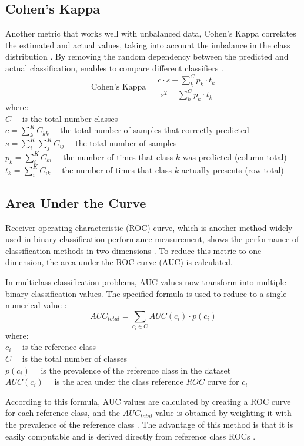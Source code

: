 \subsection{Cohen's Kappa}
Another metric that works well with unbalanced data, Cohen's Kappa correlates the estimated and actual values, taking into account the imbalance in the class distribution \cite{maaritwidmannalfredoroccato2021}. By removing the random dependency between the predicted and actual classification, enables to compare different classifiers \cite{grandini2020metrics}. 
\begin{equation}
\text{Cohen's Kappa} = \displaystyle\frac{c \cdot s-\displaystyle\sum_{k}^{C} p_{k} \cdot t_{k}}{s^{2}-\displaystyle\sum_{k}^{C} p_{k} \cdot t_{k}}
\label{kappa}	
\end{equation}
where:\\
$C\quad$ is the total number classes\\
$c=\displaystyle\sum_{k}^{K} C_{k k} \quad$ the total number of samples that correctly predicted\\
$s=\displaystyle\sum_{i}^{K} \displaystyle\sum_{j}^{K} C_{i j}\quad$ the total number of samples\\
$p_{k}=\displaystyle\sum_{i}^{K} C_{k i}\quad$ the number of times that class $k$ was predicted (column total)\\
$t_{k}=\displaystyle\sum_{i}^{K} C_{i k}\quad$ the number of times that class $k$ actually presents (row total)

\subsection{Area Under the Curve}
Receiver operating characteristic (ROC) curve, which is another method widely used in binary classification performance measurement, shows the performance of classification methods in two dimensions \cite{fawcett2004roc}. To reduce this metric to one dimension, the area under the ROC curve (AUC) is calculated.

In multiclass classification problems, AUC values now transform into multiple binary classification values. The specified formula is used to reduce to a single numerical value \cite{fawcett2004roc}:
\begin{equation}
AUC_{total} = \displaystyle\sum_{c_{i} \in C} AUC(c_{i}) \cdot p(c_{i})
\label{auc}
\end{equation}
where:\\
$c_{i} \quad$ is the reference class \\
$C \quad$ is the total number of classes\\
$p(c_i) \quad$ is the prevalence of the reference class in the dataset\\
$AUC(c_{i}) \quad$ is the area under the class reference $ROC$ curve for $c_{i}$

According to this formula, AUC values are calculated by creating a ROC curve for each reference class, and the $AUC_{total}$ value is obtained by weighting it with the prevalence of the reference class \cite{fawcett2004roc,he2009learning}. The advantage of this method is that it is easily computable and is derived directly from reference class ROCs \cite{fawcett2004roc}.